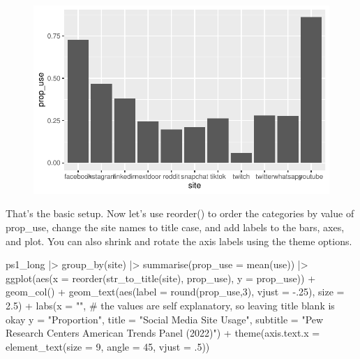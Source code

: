 \documentclass[
  letterpaper,
  DIV=11,
  numbers=noendperiod]{scrartcl}
\newenvironment{Shaded}{\begin{snugshade}}{\end{snugshade}}
\newcommand{\AttributeTok}[1]{\textcolor[rgb]{0.40,0.45,0.13}{#1}}
\newcommand{\CommentTok}[1]{\textcolor[rgb]{0.37,0.37,0.37}{#1}}
\newcommand{\DecValTok}[1]{\textcolor[rgb]{0.68,0.00,0.00}{#1}}
\newcommand{\FloatTok}[1]{\textcolor[rgb]{0.68,0.00,0.00}{#1}}
\newcommand{\FunctionTok}[1]{\textcolor[rgb]{0.28,0.35,0.67}{#1}}
\newcommand{\NormalTok}[1]{\textcolor[rgb]{0.00,0.23,0.31}{#1}}
\newcommand{\SpecialCharTok}[1]{\textcolor[rgb]{0.37,0.37,0.37}{#1}}
\newcommand{\StringTok}[1]{\textcolor[rgb]{0.13,0.47,0.30}{#1}}
\begin{document}
\begin{figure}[H]

{\centering \includegraphics{ps1_ml_files/figure-pdf/unnamed-chunk-21-1.pdf}

}

\end{figure}

That's the basic setup. Now let's use reorder() to order the categories
by value of prop\_use, change the site names to title case, and add
labels to the bars, axes, and plot. You can also shrink and rotate the
axis labels using the theme options.

\begin{Shaded}
\begin{Highlighting}[]
\NormalTok{ps1\_long }\SpecialCharTok{|\textgreater{}} 
  \FunctionTok{group\_by}\NormalTok{(site) }\SpecialCharTok{|\textgreater{}} 
  \FunctionTok{summarise}\NormalTok{(}\AttributeTok{prop\_use =} \FunctionTok{mean}\NormalTok{(use)) }\SpecialCharTok{|\textgreater{}} 
  \FunctionTok{ggplot}\NormalTok{(}\FunctionTok{aes}\NormalTok{(}\AttributeTok{x =} \FunctionTok{reorder}\NormalTok{(}\FunctionTok{str\_to\_title}\NormalTok{(site), prop\_use), }
             \AttributeTok{y =}\NormalTok{ prop\_use)) }\SpecialCharTok{+} 
  \FunctionTok{geom\_col}\NormalTok{() }\SpecialCharTok{+}
  \FunctionTok{geom\_text}\NormalTok{(}\FunctionTok{aes}\NormalTok{(}\AttributeTok{label =} \FunctionTok{round}\NormalTok{(prop\_use,}\DecValTok{3}\NormalTok{), }\AttributeTok{vjust =} \SpecialCharTok{{-}}\NormalTok{.}\DecValTok{25}\NormalTok{), }\AttributeTok{size =} \FloatTok{2.5}\NormalTok{) }\SpecialCharTok{+}
  \FunctionTok{labs}\NormalTok{(}\AttributeTok{x =} \StringTok{""}\NormalTok{, }\CommentTok{\# the values are self explanatory, so leaving title blank is okay}
       \AttributeTok{y =} \StringTok{"Proportion"}\NormalTok{,}
       \AttributeTok{title =} \StringTok{"Social Media Site Usage"}\NormalTok{,}
       \AttributeTok{subtitle =} \StringTok{"Pew Research Center\textquotesingle{}s American Trends Panel (2022)"}\NormalTok{) }\SpecialCharTok{+}
  \FunctionTok{theme}\NormalTok{(}\AttributeTok{axis.text.x =} \FunctionTok{element\_text}\NormalTok{(}\AttributeTok{size =} \DecValTok{9}\NormalTok{, }\AttributeTok{angle =} \DecValTok{45}\NormalTok{, }\AttributeTok{vjust =}\NormalTok{ .}\DecValTok{5}\NormalTok{))}
\end{Highlighting}
\end{Shaded}
\end{document}
